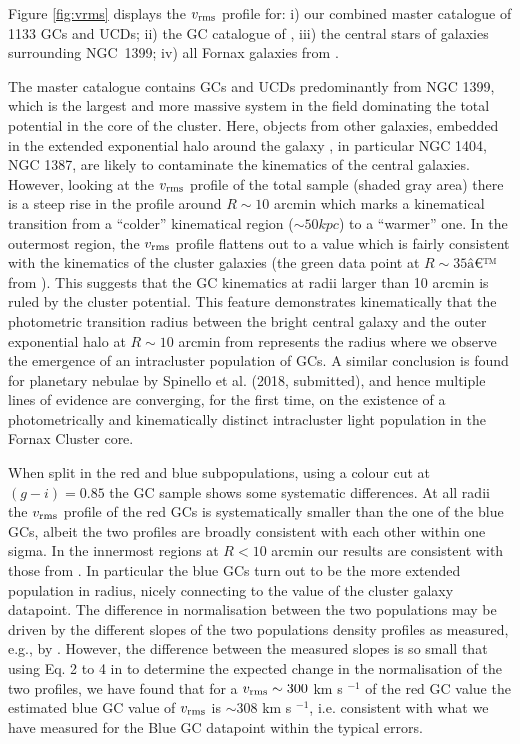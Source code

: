 \documentclass[useAMS,usenatbib]{mn2e}
\begin{document}
Figure \ref{fig:vrms} displays the $v_{\rm rms}$ profile for: i) our combined 
master catalogue of 1133 GCs and UCDs; ii) the GC catalogue of 
\citet{Schuberth}, iii) the central stars of galaxies surrounding NGC~1399; iv) 
all Fornax galaxies from \citet{Drinkwater00}. 

The master catalogue contains GCs and UCDs predominantly from NGC 1399, which 
is the largest and more massive system in the field dominating the total 
potential in the core of the cluster. Here, objects from other galaxies, 
embedded in the extended exponential halo around the galaxy \citep{Iodice16}, 
in particular NGC 1404, NGC 1387, are likely to contaminate the 
kinematics of the central galaxies. However, looking at the $v_{\rm rms}$ 
profile of the total sample (shaded gray area) there is a steep rise in the 
profile around $R\sim10$ arcmin which marks a kinematical transition from a 
``colder'' kinematical region ($\sim 50 kpc$) to a ``warmer'' one. In the 
outermost region, the $v_{\rm rms}$ profile flattens out to a value which is 
fairly consistent with the kinematics of the cluster galaxies (the green data 
point at $R\sim35â€™$ from \citealt{Drinkwater00}). This suggests that the GC 
kinematics at radii larger than 10 arcmin is ruled by the cluster potential. 
This feature demonstrates kinematically that the photometric transition radius 
between the bright central galaxy and the outer exponential halo at $R\sim10$ 
arcmin from \citet{Iodice16} represents the radius where we observe the 
emergence of an intracluster population of GCs. A similar conclusion is found 
for planetary nebulae by Spinello et al. (2018, submitted), and hence multiple lines of 
evidence are converging, for the first time, on the existence of a 
photometrically and kinematically distinct intracluster light population in the 
Fornax Cluster core.

When split in the red and blue subpopulations, using a colour cut at $(g - i) = 0.85$ 
the GC sample shows some systematic differences. At all radii the $v_{\rm rms}$ 
profile of the red GCs is systematically smaller than the one of the blue GCs, 
albeit the two profiles are broadly consistent with each other within one sigma. 
In the innermost regions at $R < 10$ arcmin our results are consistent with  
those from \citet{Schuberth}. In particular the blue GCs turn out to 
be the more extended population in radius, nicely connecting to the value of 
the cluster galaxy datapoint. The difference in normalisation between the two 
populations may be driven by the different slopes of the two 
populations density profiles as measured, e.g., by 
\citep[][their Eq. 10 and 11 and Table 5]{Schuberth}. However, the difference 
between the measured  slopes is so small that using Eq. 2 to 4 in \citet{Napolitano14} to 
determine the expected change in the normalisation of the two profiles, we have 
found that for a $v_{\rm rms} \sim 300$ km s $^{-1}$ of the red GC value the 
estimated blue GC value of $v_{\rm rms}$ is $\sim 308$ km s $^{-1}$, i.e. 
consistent with what we have measured for the Blue GC datapoint within the 
typical errors.
\end{document}
